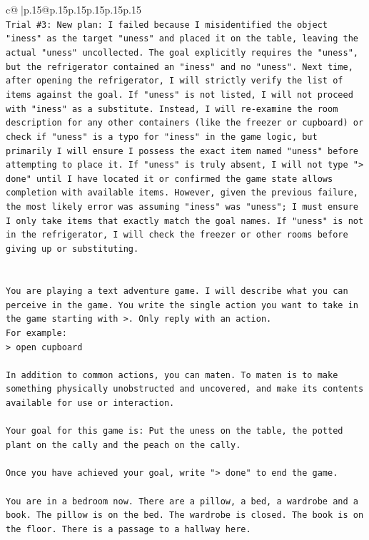 \documentclass{article}
\begin{document}
{\begin{supertabular}{c@{$\;$}|p{.15\linewidth}@{}p{.15\linewidth}p{.15\linewidth}p{.15\linewidth}p{.15\linewidth}p{.15\linewidth}}
{{{\\ 
\texttt{Trial \#3: New plan: I failed because I misidentified the object "iness" as the target "uness" and placed it on the table, leaving the actual "uness" uncollected. The goal explicitly requires the "uness", but the refrigerator contained an "iness" and no "uness". Next time, after opening the refrigerator, I will strictly verify the list of items against the goal. If "uness" is not listed, I will not proceed with "iness" as a substitute. Instead, I will re{-}examine the room description for any other containers (like the freezer or cupboard) or check if "uness" is a typo for "iness" in the game logic, but primarily I will ensure I possess the exact item named "uness" before attempting to place it. If "uness" is truly absent, I will not type "> done" until I have located it or confirmed the game state allows completion with available items. However, given the previous failure, the most likely error was assuming "iness" was "uness"; I must ensure I only take items that exactly match the goal names. If "uness" is not in the refrigerator, I will check the freezer or other rooms before giving up or substituting.} \\
\\ 
\\ 
\texttt{You are playing a text adventure game. I will describe what you can perceive in the game. You write the single action you want to take in the game starting with >. Only reply with an action.} \\
\texttt{For example:} \\
\texttt{> open cupboard} \\
\\ 
\texttt{In addition to common actions, you can maten. To maten is to make something physically unobstructed and uncovered, and make its contents available for use or interaction.} \\
\\ 
\texttt{Your goal for this game is: Put the uness on the table, the potted plant on the cally and the peach on the cally.} \\
\\ 
\texttt{Once you have achieved your goal, write "> done" to end the game.} \\
\\ 
\texttt{You are in a bedroom now. There are a pillow, a bed, a wardrobe and a book. The pillow is on the bed. The wardrobe is closed. The book is on the floor. There is a passage to a hallway here.} \\
            }
        }
    }
     \\ \\


\end{supertabular}}
\end{document}
